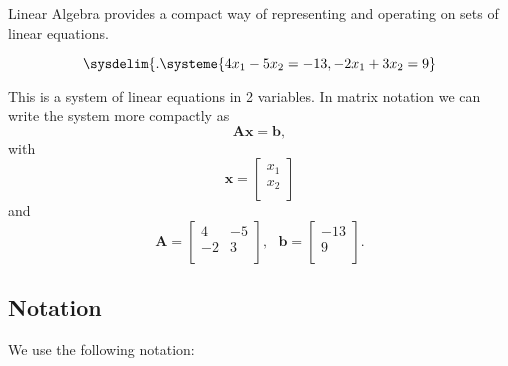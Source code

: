 Linear Algebra provides a compact way of representing and operating on sets of linear equations.


\begin{equation*}
\sysdelim\{.\systeme{4x_{1}-5x_{2}=-13,-2x_{1}+3x_{2}=9}
\end{equation*}

This is a system of linear equations in 2 variables. In matrix notation we can write the system more compactly as 
\begin{equation*}
\textbf{A}\textbf{x}=\textbf{b},
\end{equation*}
with
\begin{equation*}
\textbf{x}= \left[
\begin{array}{c}
x_1 \\
x_2 \\
\end{array} \right]
\end{equation*}
and
\begin{equation*}
\textbf{A}= \left[ \begin{array}{cc}
4 & -5 \\
-2 & 3 \\
\end{array} \right], \text{	} \textbf{b}= \left[ \begin{array}{c}
-13 \\
9 \\
\end{array}\right].
\end{equation*}

\subsection{Notation}

We use the following notation:


